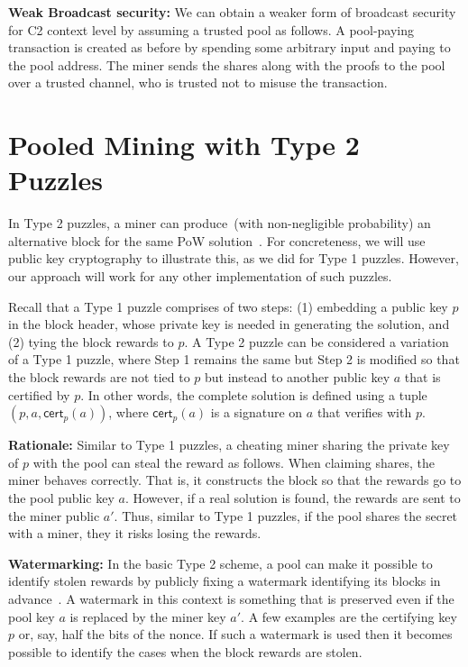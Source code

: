 \documentclass[runningheads]{llncs}
\begin{document}
\textbf{Weak Broadcast security:} We can obtain a weaker form of broadcast security for C2 context level by assuming a trusted pool as follows. A pool-paying transaction is created as before by spending some arbitrary input and paying to the pool address. The miner sends the shares along with the proofs to the pool over a trusted channel, who is trusted not to misuse the transaction.


\section{Pooled Mining with Type 2 Puzzles}
\label{bypasstype2}

In Type 2 puzzles, a miner can produce~(with non-negligible probability) an alternative block for the same PoW solution~\cite{miller2015nonoutsourceable}.
For concreteness, we will use public key cryptography to illustrate this, as we did for Type 1 puzzles. However, our approach will work for any other implementation of such puzzles.


Recall that a Type 1 puzzle comprises of two steps: (1) embedding a public key $p$ in the block header, whose private key is needed in generating the solution, and (2) tying the block rewards to $p$. 
A Type 2 puzzle can be considered a variation of a Type 1 puzzle, where Step 1 remains the same but Step 2 is modified so that the block rewards are not tied to $p$ but instead to another public key $a$ that is certified by $p$. In other words, the complete solution is defined using a tuple $(p, a, \textsf{cert}_p(a))$, where $\textsf{cert}_p(a)$ is a signature on $a$ that verifies with $p$. 


\textbf{Rationale:} Similar to Type 1 puzzles, a cheating miner sharing the private key of $p$ with the pool can steal the reward as follows. When claiming shares, the miner behaves correctly. That is, it constructs the block so that the rewards go to the pool public key $a$. However, if a real solution is found, the rewards are sent to the miner public $a'$. Thus, similar to Type 1 puzzles, if the pool shares the secret with a miner, they it risks losing the rewards. 


\textbf{Watermarking:} In the basic Type 2 scheme, a pool can make it possible to identify stolen rewards by publicly fixing a watermark identifying its blocks in advance~\cite{miller2015nonoutsourceable}. A watermark in this context is something that is preserved even if the pool key $a$ is replaced by the miner key $a'$. A few examples are the certifying key $p$ or, say, half the bits of the nonce. If such a watermark is used then it becomes possible to identify the cases when the block rewards are stolen. 
\end{document}
